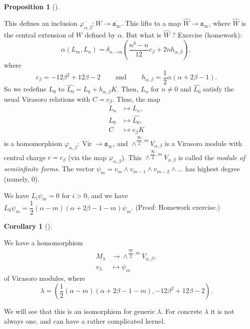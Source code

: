 \documentclass
[numbers=enddot,12pt,final,onecolumn,german,notitlepage]{scrartcl}%
\theoremstyle{definition}
\newtheorem{prop}[theo]{Proposition}
\newenvironment{proposition}[1][]
{\begin{prop}[#1]\begin{leftbar}}
{\end{leftbar}\end{prop}}
\newtheorem{coro}[theo]{Corollary}
\newenvironment{corollary}[1][]
{\begin{coro}[#1]\begin{leftbar}}
{\end{leftbar}\end{coro}}
\begin{document}
\begin{proposition}
This defines an inclusion $\overline{\varphi_{\alpha,\beta}}:W\rightarrow
\overline{\mathfrak{a}_{\infty}}$. This lifts to a map $\widehat{W}%
\rightarrow\mathfrak{a}_{\infty}$, where $\widehat{W}$ is the central
extension of $W$ defined by $\alpha$. But what is $\widehat{W}$ ? Exercise
(homework):%
\[
\alpha\left(  L_{m},L_{n}\right)  =\delta_{n,-m}\left(  \dfrac{n^{3}-n}%
{12}c_{\beta}+2nh_{\alpha,\beta}\right)  ,
\]
where
\[
c_{\beta}=-12\beta^{2}+12\beta-2\ \ \ \ \ \ \ \ \ \ \text{and}%
\ \ \ \ \ \ \ \ \ \ h_{\alpha,\beta}=\dfrac{1}{2}\alpha\left(  \alpha
+2\beta-1\right)  .
\]
So we redefine $L_{0}$ to $\widehat{L_{0}}=L_{0}+h_{\alpha,\beta}K$. Then,
$L_{n}$ for $n\neq0$ and $\widehat{L_{0}}$ satisfy the usual Virasoro
relations with $C=c_{\beta}$. Thus, the map%
\begin{align*}
L_{n}  &  \mapsto L_{n},\\
L_{0}  &  \mapsto\widehat{L_{0}},\\
C  &  \mapsto c_{\beta}K
\end{align*}
is a homomorphism $\varphi_{\alpha,\beta}:\operatorname*{Vir}\rightarrow
\mathfrak{a}_{\infty}$, and $\wedge^{\dfrac{\infty}{2},m}V_{\alpha,\beta}$ is
a Virasoro module with central charge $c=c_{\beta}$ (via the map
$\varphi_{\alpha,\beta}$). This $\wedge^{\dfrac{\infty}{2},m}V_{\alpha,\beta}$
is called the \textit{module of semiinfinite forms}. The vector $\psi
_{m}=v_{m}\wedge v_{m-1}\wedge v_{m-2}\wedge...$ has highest degree (namely,
$0$).

We have $L_{i}\psi_{m}=0$ for $i>0$, and we have $L_{0}\psi_{m}=\dfrac{1}%
{2}\left(  \alpha-m\right)  \left(  \alpha+2\beta-1-m\right)  \psi_{m}$.
(Proof: Homework exercise.)
\end{proposition}

\begin{corollary}
We have a homomorphism%
\begin{align*}
M_{\lambda}  &  \rightarrow\wedge^{\dfrac{\infty}{2},m}V_{\alpha,\beta},\\
v_{\lambda}  &  \mapsto\psi_{m}%
\end{align*}
of Virasoro modules, where%
\[
\lambda=\left(  \dfrac{1}{2}\left(  \alpha-m\right)  \left(  \alpha
+2\beta-1-m\right)  ,-12\beta^{2}+12\beta-2\right)  .
\]

\end{corollary}

We will see that this is an isomorphism for generic $\lambda$. For concrete
$\lambda$ it is not always one, and can have a rather complicated kernel.
\end{document}
